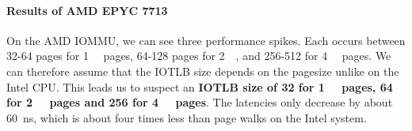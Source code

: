 \paragraph{Results of AMD EPYC 7713}
On the AMD IOMMU, we can see three performance spikes. Each occurs between 32-64 pages for \qty{1}{\gibi\byte} pages, 64-128 pages for \qty{2}{\mebi\byte}, and 256-512 for \qty{4}{\kibi\byte} pages.
We can therefore assume that the IOTLB size depends on the pagesize unlike on the Intel CPU. This leads us to suspect an \textbf{IOTLB size of 32 for \qty{1}{\gibi\byte} pages, 64 for \qty{2}{\mebi\byte} pages and 256 for \qty{4}{\kibi\byte} pages}. The latencies only decrease by about \qty{60}{ns}, which is about four times less than page walks on the Intel system.